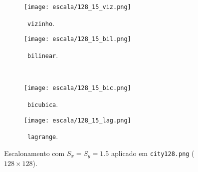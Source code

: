 \begin{figure}[H]
    \centering
    \begin{subfigure}{0.3\textwidth}
        \centering
        \texttt{[image: escala/128\_15\_viz.png]}
        \caption{~\texttt{vizinho}.}
    \end{subfigure}%
    \hspace{8pt}
    \begin{subfigure}{0.3\textwidth}
        \centering
        \texttt{[image: escala/128\_15\_bil.png]}
        \caption{~\texttt{bilinear}.}
    \end{subfigure}
    \\[8pt]
    \begin{subfigure}{0.3\textwidth}
        \centering
        \texttt{[image: escala/128\_15\_bic.png]}
        \caption{~\texttt{bicubica}.}
    \end{subfigure}%
    \hspace{8pt}%
    \begin{subfigure}{0.3\textwidth}
        \centering
        \texttt{[image: escala/128\_15\_lag.png]}
        \caption{~\texttt{lagrange}.}
    \end{subfigure}

    \caption{Escalonamento com $S_x = S_y = 1.5$ aplicado em \texttt{city128.png} ($128 \times 128$).}
    \label{fig:esc:15}
\end{figure}